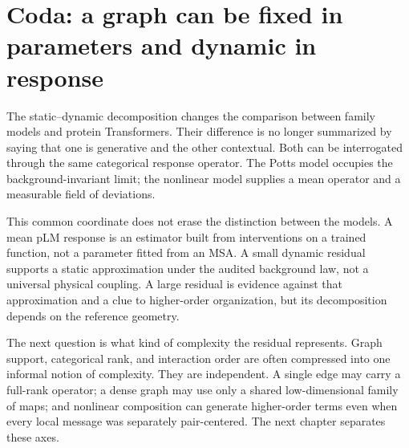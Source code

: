\section*{Coda: a graph can be fixed in parameters and dynamic in response}

The static--dynamic decomposition changes the comparison between family models and protein
Transformers.  Their difference is no longer summarized by saying that one is generative and the
other contextual.  Both can be interrogated through the same categorical response operator.  The
Potts model occupies the background-invariant limit; the nonlinear model supplies a mean operator
and a measurable field of deviations.

This common coordinate does not erase the distinction between the models.  A mean pLM response is
an estimator built from interventions on a trained function, not a parameter fitted from an MSA.
A small dynamic residual supports a static approximation under the audited background law, not a
universal physical coupling.  A large residual is evidence against that approximation and a clue
to higher-order organization, but its decomposition depends on the reference geometry.

The next question is what kind of complexity the residual represents.  Graph support, categorical
rank, and interaction order are often compressed into one informal notion of complexity.  They are
independent.  A single edge may carry a full-rank operator; a dense graph may use only a shared
low-dimensional family of maps; and nonlinear composition can generate higher-order terms even
when every local message was separately pair-centered.  The next chapter separates these axes.
